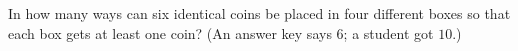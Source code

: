 In how many ways can six identical coins be placed in four different boxes so that each box gets at least one coin? (An answer key says $6$; a student got $10$.)

